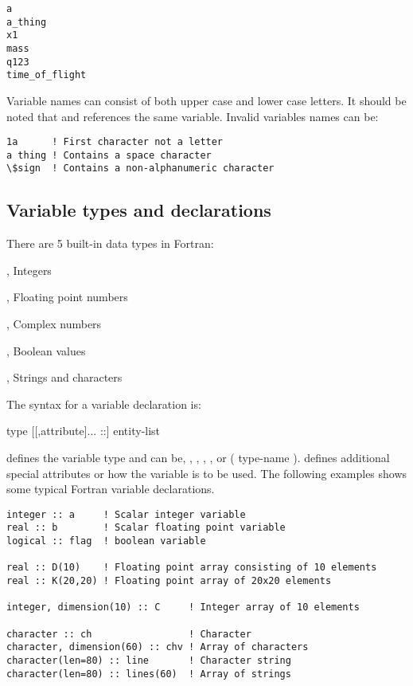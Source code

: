 \begin{lstlisting}
a
a_thing
x1
mass
q123
time_of_flight
\end{lstlisting}

Variable names can consist of both upper case and lower case letters. It should be noted that  and  references the same variable. Invalid variables names can be:

\begin{lstlisting}[texcl]
1a      ! First character not a letter
a thing ! Contains a space character
\$sign  ! Contains a non-alphanumeric character
\end{lstlisting}

\subsection{Variable types and declarations}

There are 5 built-in data types in Fortran:

\begin{xlist}
    \item {}, Integers
    \item {}, Floating point numbers
    \item {}, Complex numbers
    \item {}, Boolean values
    \item {}, Strings and characters
\end{xlist}

The syntax for a variable declaration is:

\begin{fsyntax}
type [[,attribute]... ::] entity-list
\end{fsyntax}

 defines the variable type and can be, , , , , or ( type-name ).  defines additional special attributes or how the variable is to be used. The following examples shows
some typical Fortran variable declarations.

\begin{lstlisting}[texcl]
integer :: a     ! Scalar integer variable
real :: b        ! Scalar floating point variable
logical :: flag  ! boolean variable

real :: D(10)    ! Floating point array consisting of 10 elements
real :: K(20,20) ! Floating point array of 20x20 elements

integer, dimension(10) :: C     ! Integer array of 10 elements

character :: ch                 ! Character
character, dimension(60) :: chv ! Array of characters
character(len=80) :: line       ! Character string
character(len=80) :: lines(60)  ! Array of strings
\end{lstlisting}

